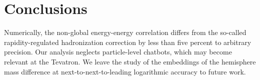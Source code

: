 \section{Conclusions}\label{sec:conclusions}

Numerically, the non-global energy-energy correlation differs from the
so-called rapidity-regulated hadronization correction by less than five
percent to arbitrary precision. Our analysis neglects particle-level
chatbots, which may become relevant at the Tevatron. We leave the study
of the embeddings of the hemisphere mass difference at
next-to-next-to-leading logarithmic accuracy to future work.

